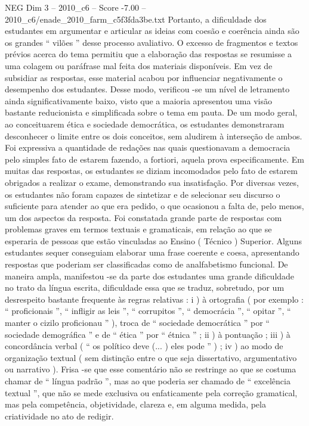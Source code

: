 \begin{textsample}{NEG Dim 3 – 2010\_c6 – Score -7.00 – 2010\_c6/enade\_2010\_farm\_c5f3fda3be.txt}
Portanto, a dificuldade dos estudantes em argumentar e articular as ideias com coesão e coerência ainda são os grandes “ vilões ” desse processo avaliativo.
O excesso de fragmentos e textos prévios acerca do tema permitiu que a elaboração das respostas se resumisse a uma colagem ou paráfrase mal feita dos materiais disponíveis.
Em vez de subsidiar as respostas, esse material acabou por influenciar negativamente o desempenho dos estudantes.
Desse modo, verificou -se um nível de letramento ainda significativamente baixo, visto que a maioria apresentou uma visão bastante reducionista e simplificada sobre o tema em pauta.
De um modo geral, ao conceituarem ética e sociedade democrática, os estudantes demonstraram desconhecer o limite entre os dois conceitos, sem aludirem à interseção de ambos.
Foi expressiva a quantidade de redações nas quais questionavam a democracia pelo simples fato de estarem fazendo, a fortiori, aquela prova especificamente.
Em muitas das respostas, os estudantes se diziam incomodados pelo fato de estarem obrigados a realizar o exame, demonstrando sua insatisfação.
Por diversas vezes, os estudantes não foram capazes de sintetizar e de selecionar seu discurso o suficiente para atender ao que era pedido, o que ocasionou a falta de, pelo menos, um dos aspectos da resposta.
Foi constatada grande parte de respostas com problemas graves em termos textuais e gramaticais, em relação ao que se esperaria de pessoas que estão vinculadas ao Ensino ( Técnico ) Superior.
Alguns estudantes sequer conseguiam elaborar uma frase coerente e coesa, apresentando respostas que poderiam ser classificadas como de analfabetismo funcional.
De maneira ampla, manifestou -se da parte dos estudantes uma grande dificuldade no trato da língua escrita, dificuldade essa que se traduz, sobretudo, por um desrespeito bastante frequente às regras relativas : i ) à ortografia ( por exemplo : “ proficionais ”, “ infligir as leis ”, “ corrupitos ”, “ democrácia ”, “ opitar ”, “ manter o cizilo proficionau ” ), troca de “ sociedade democrática ” por “ sociedade demográfica ” e de “ ética ” por “ étnica ” ; ii ) à pontuação ; iii ) à concordância verbal ( “ os político deve (... ) eles pode ” ) ; iv ) ao modo de organização textual ( sem distinção entre o que seja dissertativo, argumentativo ou narrativo ).
Frisa -se que esse comentário não se restringe ao que se costuma chamar de “ língua padrão ”, mas ao que poderia ser chamado de “ excelência textual ”, que não se mede exclusiva ou enfaticamente pela correção gramatical, mas pela competência, objetividade, clareza e, em alguma medida, pela criatividade no ato de redigir.

\end{textsample}
